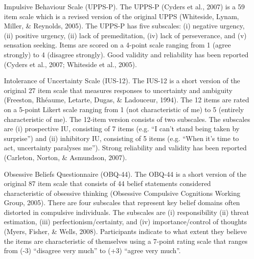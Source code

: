 Impulsive Behaviour Scale (UPPS-P). The UPPS-P (Cyders et al., 2007) is a 59 item scale which is a revised version of the original UPPS (Whiteside, Lynam, Miller, & Reynolds, 2005).  The UPPS-P has five subscales: (i) negative urgency, (ii) positive urgency, (ii) lack of premeditation, (iv) lack of perseverance, and (v) sensation seeking. Items are scored on a 4-point scale ranging from 1 (agree strongly) to 4 (disagree strongly). Good validity and reliability has been reported (Cyders et al., 2007; Whiteside et al., 2005).

Intolerance of Uncertainty Scale (IUS-12). The IUS-12 is a short version of the original 27 item scale that measures responses to uncertainty and ambiguity (Freeston, Rhéaume, Letarte, Dugas, & Ladouceur, 1994).  The 12 items are rated on a 5-point Likert scale ranging from 1 (not characteristic of me) to 5 (entirely characteristic of me). The 12-item version consists of two subscales. The subscales are (i) prospective IU, consisting of 7 items (e.g. “I can’t stand being taken by surprise”) and (ii) inhibitory IU, consisting of 5 items (e.g. “When it’s time to act, uncertainty paralyses me”).  Strong reliability and validity has been reported (Carleton, Norton, & Asmundson, 2007).

Obsessive Beliefs Questionnaire (OBQ-44). The OBQ-44 is a short version of the original 87 item scale that consists of 44 belief statements considered characteristic of obsessive thinking (Obsessive Compulsive Cognitions Working Group, 2005). There are four subscales that represent key belief domains often distorted in compulsive individuals. The subscales are (i) responsibility (ii) threat estimation, (iii) perfectionism/certainty, and (iv) importance/control of thoughts (Myers, Fisher, & Wells, 2008). Participants indicate to what extent they believe the items are characteristic of themselves using a 7-point rating scale that ranges from (-3) “disagree very much” to (+3) “agree very much”.


